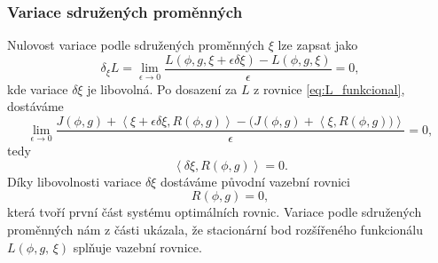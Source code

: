 \subsubsection{Variace sdružených proměnných}
Nulovost variace podle sdružených proměnných $ \xi $ lze zapsat jako
\begin{equation*}
\delta_\xi L = \lim\limits_{\epsilon\rightarrow0}\dfrac{L(\phi,g,\xi+\epsilon\delta\xi)-L(\phi,g,\xi)}{\epsilon}=0,
\end{equation*}
kde variace $ \delta\xi $ je libovolná. Po dosazení za $ L $ z rovnice \ref{eq:L_funkcional}, dostáváme
\begin{equation*}
\lim\limits_{\epsilon\rightarrow0} \dfrac
{J(\phi, g) +  \left\langle\xi+\epsilon\delta\xi, R(\phi, g)\right\rangle - (J(\phi, g) +   \left\langle\xi , R(\phi, g))\right\rangle }
{\epsilon}
=0,
\end{equation*}
tedy 
\begin{equation*}
 \left\langle\delta\xi , R(\phi, g) \right\rangle = 0.
\end{equation*}
Díky libovolnosti variace $ \delta\xi $ dostáváme původní vazební rovnici 
\begin{equation}\label{eq:vazebni_rce}
R(\phi, g)=0,
\end{equation}
která tvoří první část systému optimálních rovnic. Variace podle sdružených proměnných nám z části ukázala, že stacionární bod rozšířeného funkcionálu $ L(\phi, g,\,\xi)  $ splňuje vazební rovnice.

